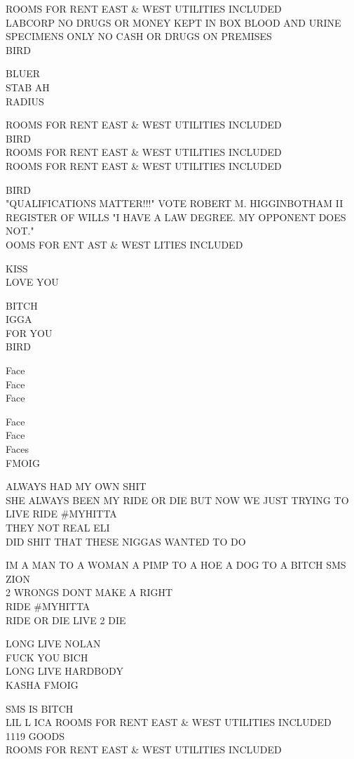\documentclass[10pt,letterpaper]{article}
\begin{document}
ROOMS FOR RENT EAST \& WEST UTILITIES INCLUDED\\
LABCORP NO DRUGS OR MONEY KEPT IN BOX BLOOD AND URINE SPECIMENS ONLY NO CASH OR DRUGS ON PREMISES\\
BIRD

BLUER\\
STAB AH\\
RADIUS

ROOMS FOR RENT EAST \& WEST UTILITIES INCLUDED\\
BIRD\\
ROOMS FOR RENT EAST \& WEST UTILITIES INCLUDED\\
ROOMS FOR RENT EAST \& WEST UTILITIES INCLUDED

BIRD\\
"QUALIFICATIONS MATTER!!!" VOTE ROBERT M. HIGGINBOTHAM II REGISTER OF WILLS "I HAVE A LAW DEGREE.  MY OPPONENT DOES NOT."\\
OOMS FOR ENT AST \& WEST LITIES INCLUDED

KISS\\
LOVE YOU

BITCH\\
IGGA\\
FOR YOU\\
BIRD

Face\\
Face\\
Face

Face\\
Face\\
Faces\\
FMOIG

ALWAYS HAD MY OWN SHIT\\
SHE ALWAYS BEEN MY RIDE OR DIE BUT NOW WE JUST TRYING TO LIVE RIDE \#MYHITTA\\
THEY NOT REAL ELI\\
DID SHIT THAT THESE NIGGAS WANTED TO DO

IM A MAN TO A WOMAN A PIMP TO A HOE A DOG TO A BITCH SMS ZION\\
2 WRONGS DONT MAKE A RIGHT\\
RIDE \#MYHITTA\\
RIDE OR DIE LIVE 2 DIE

LONG LIVE NOLAN\\
FUCK YOU BICH\\
LONG LIVE HARDBODY\\
KASHA FMOIG

SMS IS BITCH\\
LIL L ICA ROOMS FOR RENT EAST \& WEST UTILITIES INCLUDED\\
1119 GOODS\\
ROOMS FOR RENT EAST \& WEST UTILITIES INCLUDED
\end{document}
